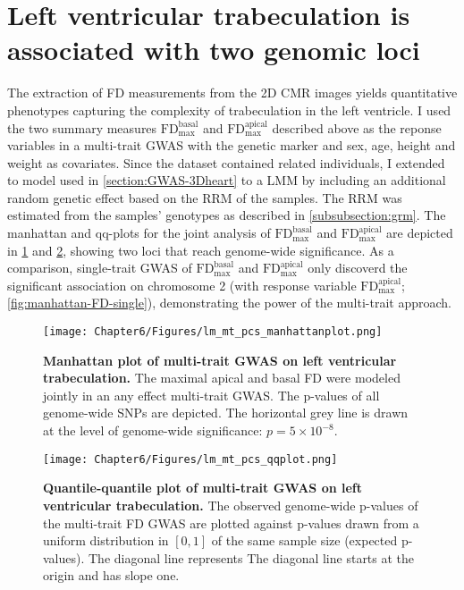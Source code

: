 \section{Left ventricular trabeculation is associated with two genomic loci}
The extraction of FD measurements from the 2D CMR images yields quantitative phenotypes capturing the complexity of trabeculation in the left ventricle. I used the two summary measures \(\text{FD}_\text{max}^\text{basal}\) and \(\text{FD}_\text{max}^\text{apical}\) described above as the reponse variables in a multi-trait GWAS with the genetic marker and sex, age, height and weight as covariates. Since the dataset contained related individuals, I extended to model used in \cref{section:GWAS-3Dheart} to a LMM by including an additional random genetic effect based on the RRM of the samples. The RRM was estimated from the samples' genotypes as described in \cref{subsubsection:grm}. The manhattan and qq-plots for the joint analysis of \(\text{FD}_\text{max}^\text{basal}\) and \(\text{FD}_\text{max}^\text{apical}\) are depicted in \cref{fig:manhattan-FD} and \cref{fig:qq-FD}, showing two loci that reach genome-wide significance. As a comparison, single-trait GWAS of  \(\text{FD}_\text{max}^\text{basal}\) and \(\text{FD}_\text{max}^\text{apical}\) only discoverd the significant association on chromosome 2 (with response variable \(\text{FD}_\text{max}^\text{apical}\); \cref{fig:manhattan-FD-single}), demonstrating the power of the multi-trait approach.
%
\begin{figure}[hbtp]
	\centering
	\texttt{[image: Chapter6/Figures/lm\_mt\_pcs\_manhattanplot.png]}
	\caption[\textbf{Manhattan plot of multi-trait GWAS on left ventricular trabeculation. }]{\textbf{Manhattan plot of multi-trait GWAS on left ventricular trabeculation. } The maximal apical and basal FD  were modeled jointly in an any effect multi-trait GWAS. The p-values of all genome-wide SNPs are depicted. The horizontal grey line is drawn at the level of genome-wide significance: \(p = 5 \times 10^{-8}\).} 
	 	\label{fig:manhattan-FD}
\end{figure}
%
\begin{figure}[hbtp]
	\centering
	\texttt{[image: Chapter6/Figures/lm\_mt\_pcs\_qqplot.png]}
	\caption[\textbf{Quantile-quantile plot of multi-trait GWAS on left ventricular trabeculation .}]{\textbf{Quantile-quantile plot of multi-trait GWAS on left ventricular trabeculation.} The observed genome-wide p-values of the multi-trait FD GWAS are plotted against p-values drawn from a uniform distribution in \([0,1]\) of the same sample size (expected p-values). The diagonal line represents The diagonal line starts at the origin and has slope one.} 
	 	\label{fig:qq-FD}
\end{figure}
